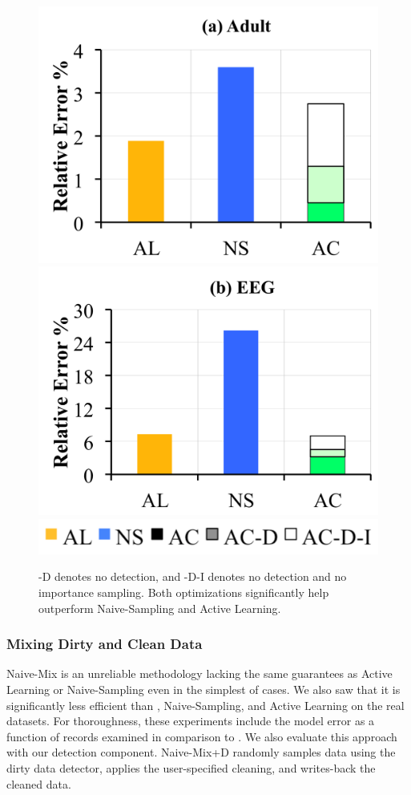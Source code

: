 \begin{figure}[t]\vspace{0.5em}
\centering
 \includegraphics[width=0.49\columnwidth]{exp/exp8a.png}
 \includegraphics[width=0.49\columnwidth]{exp/exp8b.png}
 \includegraphics[width=0.5\columnwidth]{exp/legend-8.png}\vspace{-1em}
 \caption{ -D denotes no detection, and -D-I denotes no detection and no importance sampling. Both optimizations significantly help \sys outperform Naive-Sampling and Active Learning. \label{opts}}\vspace{-1.5em}
\end{figure}

\subsubsection{Mixing Dirty and Clean Data}\label{exp:rtr}
Naive-Mix is an unreliable methodology lacking the same guarantees as Active Learning or Naive-Sampling even in the simplest of cases.
We also saw that it is significantly less efficient than \sys, Naive-Sampling, and Active Learning on the real datasets.
For thoroughness, these experiments include the model error as a function of records examined in comparison to \sys.
We also evaluate this approach with our detection component.
Naive-Mix+D randomly samples data using the dirty data detector, applies the user-specified cleaning, and writes-back the cleaned data.

